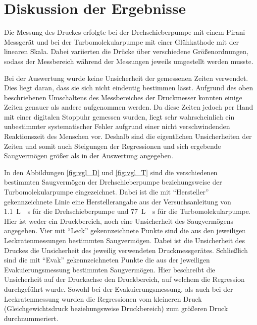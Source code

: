 \section{Diskussion der Ergebnisse}
\label{sec:Diskussion}

Die Messung des Druckes erfolgte bei der Drehschieberpumpe mit einem
Pirani-Messgerät und bei der Turbomolekularpumpe mit einer Glühkathode mit der
linearen Skala. Dabei variierten die Drücke über verschiedene Größenordnungen,
sodass der Messbereich während der Messungen jeweils umgestellt werden musste.

Bei der Auswertung wurde keine Unsicherheit der gemessenen Zeiten verwendet.
Dies liegt daran, dass sie sich nicht eindeutig bestimmen lässt.
Aufgrund des oben beschriebenen Umschaltens des Messbereiches der Druckmesser konnten
einige Zeiten genauer als andere aufgenommen werden.
Da diese Zeiten jedoch per Hand mit einer digitalen Stoppuhr gemessen wurden,
liegt sehr wahrscheinlich ein unbestimmter systematischer Fehler aufgrund einer
nicht verschwindenden Reaktionszeit des Menschen vor.
Deshalb sind die eigentlichen Unsicherheiten der Zeiten und somit auch
Steigungen der Regressionen und sich ergebende Saugvermögen größer als
in der Auswertung angegeben.

In den Abbildungen \ref{fig:vgl_D} und \ref{fig:vgl_T} sind die verschiedenen
bestimmten Saugvermögen der Drehschieberpumpe beziehungsweise der
Turbomolekularpumpe eingezeichnet.
Dabei ist die mit \enquote{Hersteller} gekennzeichnete Linie eine Herstellerangabe
aus der Versuchsanleitung \cite{anleitung} von \SI{1.1}{\liter{}\second}
für die Drehschieberpumpe und \SI{77}{\liter{}\second} für die
Turbomolekularpumpe. Hier ist weder ein Druckbereich, noch eine Unsicherheit des
Saugvermögens angegeben.
Vier mit \enquote{Leck} gekennzeichnete Punkte sind die aus den jeweiligen
Leckratenmessungen bestimmten Saugvermögen. Dabei ist die Unsicherheit des
Druckes die Unsicherheit des jeweilig verwendeten Druckmessgerätes.
Schließlich sind die mit \enquote{Evak} gekennzeichneten Punkte die aus der
jeweiligen Evakuierungsmessung bestimmten Saugvermögen. Hier beschreibt die
Unsicherheit auf der Druckachse den Druckbereich, auf welchem die Regression
durchgeführt wurde.
Sowohl bei der Evakuierungsmessung, als auch bei der Leckratenmessung wurden die
Regressionen vom kleineren Druck (Gleichgewichtsdruck beziehungsweise Druckbereich)
zum größeren Druck durchnummeriert.

